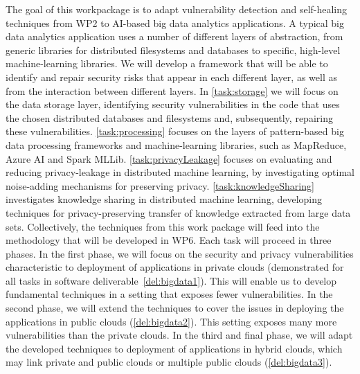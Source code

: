 \begin{Workpackage}{\thewpno}
\begin{WPDescription}
The goal of this workpackage is to adapt vulnerability detection and self-healing techniques from WP2 to AI-based big data analytics applications. A typical big data analytics application uses a number of different layers of abstraction, from generic libraries for distributed filesystems and databases to specific, high-level machine-learning libraries. We will develop a framework that will be able to identify and repair security risks that appear in each different layer, as well as from the interaction between different layers. In  \ref{task:storage} we will focus on the data storage layer, identifying security vulnerabilities in the code that uses the chosen distributed databases and filesystems and, subsequently, repairing these vulnerabilities. %
\ref{task:processing} focuses on the layers of pattern-based big data processing frameworks and machine-learning libraries, such as MapReduce, Azure AI and Spark MLLib. \ref{task:privacyLeakage} focuses on evaluating and reducing privacy-leakage in distributed machine learning, by investigating optimal noise-adding mechanisms for preserving privacy. \ref{task:knowledgeSharing} investigates knowledge sharing in distributed machine learning, developing techniques for privacy-preserving transfer of knowledge extracted from large data sets. Collectively, the techniques from this work package will feed into the \TheProject{} methodology that will be developed in WP6. Each task will proceed in three phases. In the first phase, we will focus on the security and privacy vulnerabilities characteristic to deployment of applications in private clouds (demonstrated for all tasks in software deliverable~\ref{del:bigdata1}). This will enable us to develop fundamental techniques in a setting that exposes fewer vulnerabilities. In the second phase, we will extend the techniques to cover the issues in deploying the applications in public clouds (\ref{del:bigdata2}). This setting exposes many more vulnerabilities than the private clouds. In the third and final phase, we will adapt the developed techniques to deployment of applications in hybrid clouds, which may link private and public clouds or multiple public clouds (\ref{del:bigdata3}). 
\end{WPDescription}

\begin{Task}


\end{Task}
\end{Workpackage}
